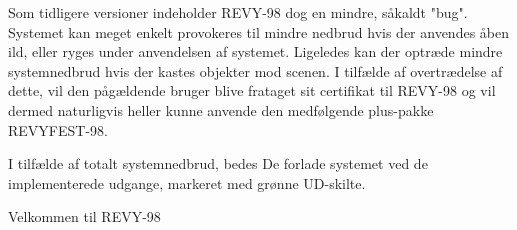 \documentclass[danish]{article}
\begin{document}
\begin{sketch}
Som tidligere versioner indeholder REVY-98 dog en mindre, såkaldt "bug". 
Systemet kan meget enkelt provokeres til mindre nedbrud hvis der anvendes 
åben ild, eller ryges under anvendelsen af systemet. Ligeledes kan der 
optræde mindre systemnedbrud hvis der kastes objekter mod scenen.
I tilfælde af overtrædelse af dette, vil den pågældende bruger blive frataget 
sit certifikat til REVY-98 og vil dermed naturligvis heller kunne anvende 
den medfølgende plus-pakke REVYFEST-98.

I tilfælde af totalt systemnedbrud, bedes De forlade systemet ved de 
implementerede udgange, markeret med grønne UD-skilte.

Velkommen til REVY-98


\end{sketch}
\end{document}
